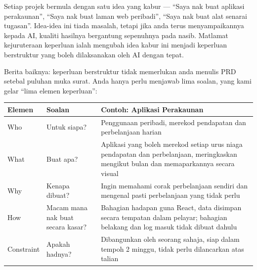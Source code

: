 


Setiap projek bermula dengan satu idea yang kabur — “Saya nak buat aplikasi perakaunan”, “Saya nak buat laman web peribadi”, “Saya nak buat alat senarai tugasan”. Idea-idea ini tiada masalah, tetapi jika anda terus menyampaikannya kepada AI, kualiti hasilnya bergantung sepenuhnya pada nasib. Matlamat kejuruteraan keperluan ialah mengubah idea kabur ini menjadi keperluan berstruktur yang boleh dilaksanakan oleh AI dengan tepat.

Berita baiknya: keperluan berstruktur tidak memerlukan anda menulis PRD setebal puluhan muka surat. Anda hanya perlu menjawab lima soalan, yang kami gelar “lima elemen keperluan”:

\begin{center}
\begin{tabularx}{\linewidth}{|X|X|X|}
\hline
\textbf{Elemen} & \textbf{Soalan} & \textbf{Contoh: Aplikasi Perakaunan} \tabularnewline
\hline
Who & Untuk siapa? & Penggunaan peribadi, merekod pendapatan dan perbelanjaan harian \tabularnewline
What & Buat apa? & Aplikasi yang boleh merekod setiap urus niaga pendapatan dan perbelanjaan, meringkaskan mengikut bulan dan memaparkannya secara visual \tabularnewline
Why & Kenapa dibuat? & Ingin memahami corak perbelanjaan sendiri dan mengenal pasti perbelanjaan yang tidak perlu \tabularnewline
How & Macam mana nak buat secara kasar? & Bahagian hadapan guna React, data disimpan secara tempatan dalam pelayar; bahagian belakang dan log masuk tidak dibuat dahulu \tabularnewline
Constraint & Apakah hadnya? & Dibangunkan oleh seorang sahaja, siap dalam tempoh 2 minggu, tidak perlu dilancarkan atas talian \tabularnewline
\hline
\end{tabularx}
\end{center}

